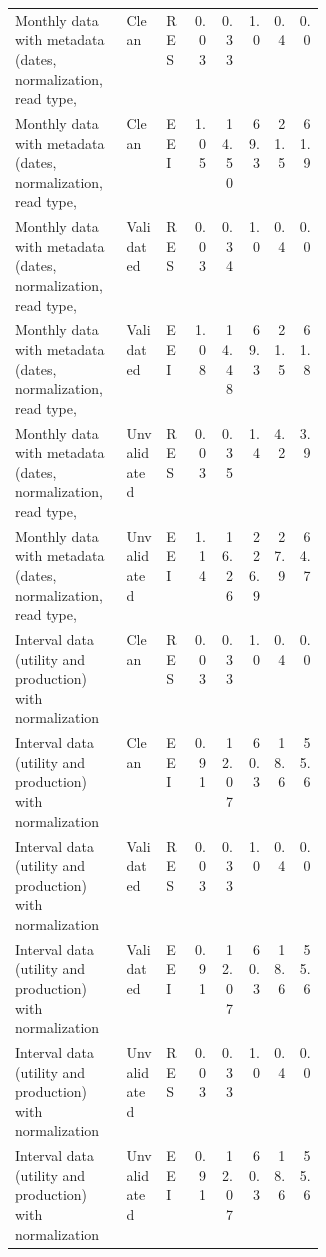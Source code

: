 \begin{longtable}{p{0.36\linewidth}llrrrrr}
Monthly data with metadata (dates, normalization, read type, & Clean & RES & 0.03 & 0.33 & 1.0 & 0.4 & 0.0 \\
Monthly data with metadata (dates, normalization, read type, & Clean & EEI & 1.05 & 14.50 & 69.3 & 21.5 & 61.9 \\
Monthly data with metadata (dates, normalization, read type, & Validated & RES & 0.03 & 0.34 & 1.0 & 0.4 & 0.0 \\
Monthly data with metadata (dates, normalization, read type, & Validated & EEI & 1.08 & 14.48 & 69.3 & 21.5 & 61.8 \\
Monthly data with metadata (dates, normalization, read type, & Unvalidated & RES & 0.03 & 0.35 & 1.4 & 4.2 & 3.9 \\
Monthly data with metadata (dates, normalization, read type, & Unvalidated & EEI & 1.14 & 16.26 & 226.9 & 27.9 & 64.7 \\
Interval data (utility and production) with normalization & Clean & RES & 0.03 & 0.33 & 1.0 & 0.4 & 0.0 \\
Interval data (utility and production) with normalization & Clean & EEI & 0.91 & 12.07 & 60.3 & 18.6 & 55.6 \\
Interval data (utility and production) with normalization & Validated & RES & 0.03 & 0.33 & 1.0 & 0.4 & 0.0 \\
Interval data (utility and production) with normalization & Validated & EEI & 0.91 & 12.07 & 60.3 & 18.6 & 55.6 \\
Interval data (utility and production) with normalization & Unvalidated & RES & 0.03 & 0.33 & 1.0 & 0.4 & 0.0 \\
Interval data (utility and production) with normalization & Unvalidated & EEI & 0.91 & 12.07 & 60.3 & 18.6 & 55.6 \\
\hline
\end{longtable}
